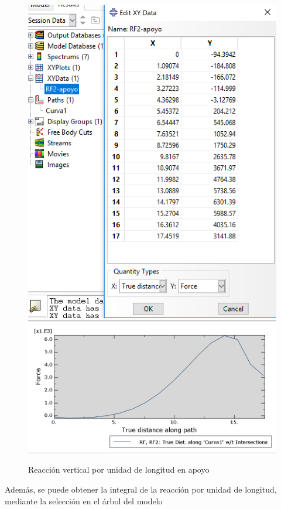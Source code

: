 \documentclass[spanish,a4paper,12pt]{article}
\begin{document}
\begin{enumerate}
\begin{figure}[!htp]
\includegraphics[scale=0.35]{capturas2019/a_fig41p2a.png}
\quad
\includegraphics[scale=0.35]{capturas2019/a_fig41p2.png}
\caption{Reacción vertical por unidad de longitud en apoyo}
  \label{fig28}
\end{figure}
\end{enumerate}
Además, se puede obtener la integral de la reacción por unidad de longitud, mediante la selección en el árbol del modelo
\end{document}
